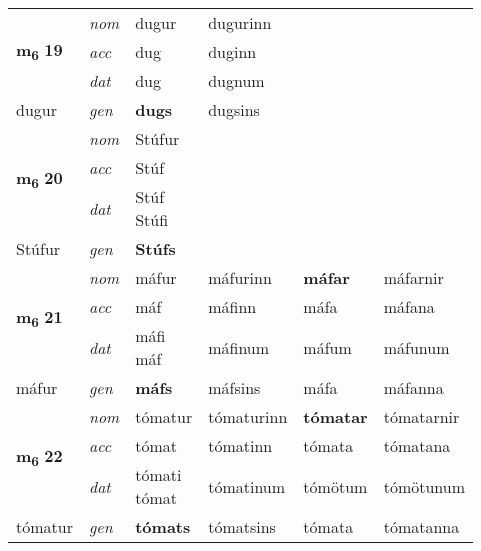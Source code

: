 \begin{longtable}[l]{llllll}
\multirow{3}{*}{{{\textbf{m{\textsubscript{6}}} \Large{\textbf{19}}}}}  & {\footnotesize{{\textit{nom}}}} & dugur & dugurinn    & \textbf{} &   \\*
 &  {\footnotesize{{\textit{acc}}}} & dug  & duginn   &   &  \\*
 &  {\footnotesize{{\textit{dat}}}} & dug & dugnum   &  &  \\*
 {\footnotesize{dugur}} &   {\footnotesize{{\textit{gen}}}} & \textbf{dugs}  & dugsins  &  &  \\
\cmidrule{1-6}


\multirow{3}{*}{{{\textbf{m{\textsubscript{6}}} \Large{\textbf{20}}}}}  & {\footnotesize{{\textit{nom}}}} & Stúfur &     & \textbf{} &   \\*
 &  {\footnotesize{{\textit{acc}}}} & Stúf  &    &   &  \\*
 &  {\footnotesize{{\textit{dat}}}} & \specialcell{Stúf\\ Stúfi} &    &  &  \\*
 {\footnotesize{Stúfur}} &   {\footnotesize{{\textit{gen}}}} & \textbf{Stúfs}  &   &  &  \\
\cmidrule{1-6}


\multirow{3}{*}{{{\textbf{m{\textsubscript{6}}} \Large{\textbf{21}}}}}  & {\footnotesize{{\textit{nom}}}} & máfur & máfurinn    & \textbf{máfar} & máfarnir  \\*
 &  {\footnotesize{{\textit{acc}}}} & máf  & máfinn   & máfa  & máfana \\*
 &  {\footnotesize{{\textit{dat}}}} & \specialcell{máfi\\ máf} & máfinum   & máfum & máfunum \\*
 {\footnotesize{máfur}} &   {\footnotesize{{\textit{gen}}}} & \textbf{máfs}  & máfsins  & máfa & máfanna \\
\cmidrule{1-6}


\multirow{3}{*}{{{\textbf{m{\textsubscript{6}}} \Large{\textbf{22}}}}}  & {\footnotesize{{\textit{nom}}}} & tómatur & tómaturinn    & \textbf{tómatar} & tómatarnir  \\*
 &  {\footnotesize{{\textit{acc}}}} & tómat  & tómatinn   & tómata  & tómatana \\*
 &  {\footnotesize{{\textit{dat}}}} & \specialcell{tómati\\ tómat} & tómatinum   & tómötum & tómötunum \\*
 {\footnotesize{tómatur}} &   {\footnotesize{{\textit{gen}}}} & \textbf{tómats}  & tómatsins  & tómata & tómatanna \\
\cmidrule{1-6}



\end{longtable}
